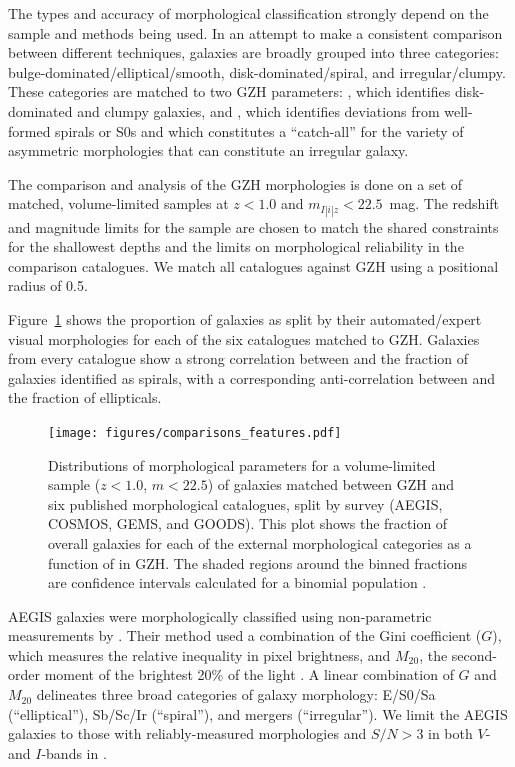 \documentclass[a4paper,fleqn,usenatbib]{mnras}
\begin{document}
The types and accuracy of morphological classification strongly depend on the
sample and methods being used. In an attempt to make a consistent comparison
between different techniques, galaxies are broadly grouped into three
categories: bulge-dominated/elliptical/smooth, disk-dominated/spiral, and
irregular/clumpy. These categories are matched to two GZH parameters:
\fbest, which identifies disk-dominated and clumpy galaxies, and \fodd, which
identifies deviations from well-formed spirals or S0s and which constitutes a
``catch-all'' for the variety of asymmetric morphologies that can constitute an
irregular galaxy. 

The comparison and analysis of the GZH morphologies is done on a set of matched,
volume-limited samples at $z<1.0$ and $m_{I|i|z} < 22.5$~mag.  The redshift and
magnitude limits for the sample are chosen to match the shared constraints for
the shallowest depths \citep[GEMS;][]{bun05} and the limits on morphological
reliability \citep[COSMOS/ZEST;][]{sca07} in the comparison catalogues. We match
all catalogues against GZH using a positional radius of 0.5\arcsec.

Figure~\ref{fig:comparisons_features} shows the proportion of galaxies as split
by their automated/expert visual morphologies for each of the six catalogues
matched to GZH. Galaxies from every catalogue show a strong correlation between
\fbest{} and the fraction of galaxies identified as spirals, with a
corresponding anti-correlation between \fbest{} and the fraction of
ellipticals.

\begin{figure}
\center
\texttt{[image: figures/comparisons\_features.pdf]}
\caption{Distributions of morphological parameters for a volume-limited sample
($z<1.0$, $m<22.5$) of galaxies matched between GZH and six published
morphological catalogues, split by survey (AEGIS, COSMOS, GEMS, and GOODS). This
plot shows the fraction of overall galaxies for each of the external
morphological categories as a function of \fbest{} in GZH. The shaded regions
around the binned fractions are confidence intervals calculated for a binomial
population \citep{cam11}.}
\label{fig:comparisons_features}
\end{figure}

AEGIS galaxies were morphologically classified using non-parametric
measurements by \citet{lot08}. Their method used a combination of the Gini
coefficient ($G$), which measures the relative inequality in pixel brightness,
and $M_{20}$, the second-order moment of the brightest 20\% of the light
\citep{lot04}. A linear combination of $G$ and $M_{20}$ delineates three broad
categories of galaxy morphology: E/S0/Sa (``elliptical''), Sb/Sc/Ir
(``spiral''), and mergers (``irregular''). We limit the AEGIS galaxies to those
with reliably-measured morphologies and $S/N>3$ in both $V$- and $I$-bands in
\citet{lot08}. 
\end{document}
